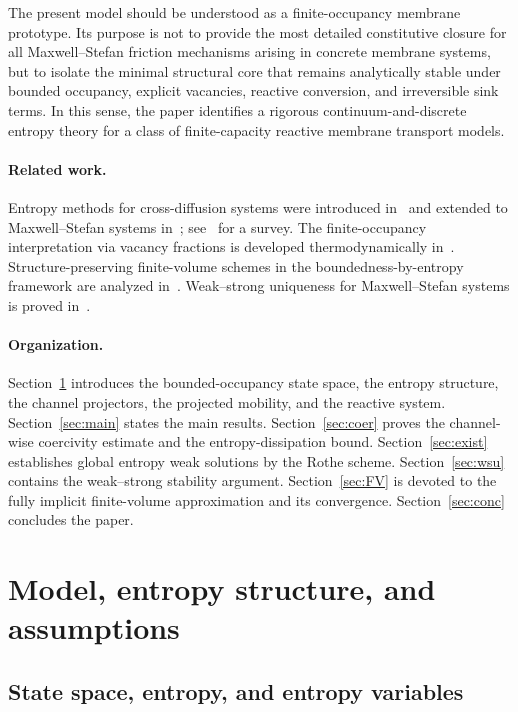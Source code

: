\documentclass{article}
\begin{document}
The present model should be understood as a finite-occupancy membrane
prototype. Its purpose is not to provide the most detailed constitutive
closure for all Maxwell--Stefan friction mechanisms arising in concrete
membrane systems, but to isolate the minimal structural core that remains
analytically stable under bounded occupancy, explicit vacancies, reactive
conversion, and irreversible sink terms. In this sense, the paper
identifies a rigorous continuum-and-discrete entropy theory for a class
of finite-capacity reactive membrane transport models.

\paragraph{Related work.}
Entropy methods for cross-diffusion systems were introduced
in~\cite{Jungel2015} and extended to Maxwell--Stefan systems
in~\cite{JungelStelzer2013}; see~\cite{Jungel2017} for a survey.
The finite-occupancy interpretation via vacancy fractions is developed
thermodynamically in~\cite{BoetheDreyer2015}.
Structure-preserving finite-volume schemes in the
boundedness-by-entropy framework are analyzed
in~\cite{Eymard2000,EymardGallouetHerbich2002,BessemoulinFilbet2012}.
Weak--strong uniqueness for Maxwell--Stefan systems is proved
in~\cite{HuoJungelTzavaras2022}.

\paragraph{Organization.}
Section~\ref{sec:model} introduces the bounded-occupancy state space,
the entropy structure, the channel projectors, the projected mobility,
and the reactive system.
Section~\ref{sec:main} states the main results.
Section~\ref{sec:coer} proves the channel-wise coercivity estimate and
the entropy-dissipation bound.
Section~\ref{sec:exist} establishes global entropy weak solutions by the
Rothe scheme.
Section~\ref{sec:wsu} contains the weak--strong stability argument.
Section~\ref{sec:FV} is devoted to the fully implicit finite-volume
approximation and its convergence.
Section~\ref{sec:conc} concludes the paper.

\section{Model, entropy structure, and assumptions}
\label{sec:model}

\subsection{State space, entropy, and entropy variables}
\end{document}
